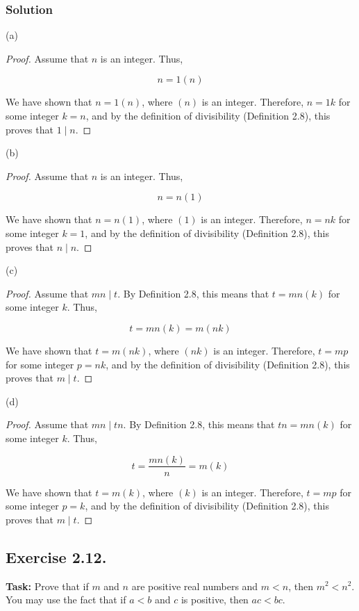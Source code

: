 \documentclass{article}
\begin{document}
\subsubsection*{Solution}

(a)

\begin{proof}
    Assume that $n$ is an integer. Thus,

    \[n=1(n)\]

    We have shown that  $n=1(n)$, where $(n)$ is an integer. Therefore, \( n = 1k \) for some integer \( k = n\), and by the definition of divisibility (Definition 2.8), this proves that \( 1 \mid n \).
\end{proof}

\noindent (b)

\begin{proof}
    Assume that $n$ is an integer. Thus,

    \[n=n(1)\]

    We have shown that  $n=n(1)$, where $(1)$ is an integer. Therefore, \( n = nk \) for some integer \( k = 1\), and by the definition of divisibility (Definition 2.8), this proves that \( n \mid n \).
\end{proof}

\noindent (c)

\begin{proof}
    Assume that  $mn \mid t$. By Definition 2.8, this means that $t=mn(k)$ for some integer $k$.
    Thus,

    \[t=mn(k)=m(nk)\]

    We have shown that  $t=m(nk)$, where $(nk)$ is an integer. Therefore, \( t = mp \) for some integer \( p = nk\), and by the definition of divisibility (Definition 2.8), this proves that \( m \mid t \).
\end{proof}

\noindent (d)

\begin{proof}
    Assume that  $mn \mid tn$. By Definition 2.8, this means that $tn=mn(k)$ for some integer $k$.
    Thus,

    \[t=\frac{mn(k)}{n}=m(k)\]

    We have shown that  $t=m(k)$, where $(k)$ is an integer. Therefore, \( t = mp \) for some integer \( p = k\), and by the definition of divisibility (Definition 2.8), this proves that \( m \mid t \).
\end{proof}

\newpage

\subsection{Exercise 2.12.}
\textbf{Task:} Prove that if $m$ and $n$ are positive real numbers and $m < n$, then $m^2 < n^2$. You may use the fact that if $a < b$ and $c$ is positive, then $ac < bc$.
\end{document}
